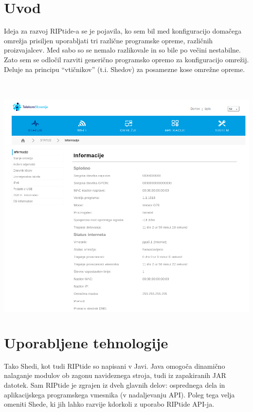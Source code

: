 \documentclass[12pt]{article}
\begin{document}
\tableofcontents
\newpage

\section{Uvod}
Ideja za razvoj RIPtide-a se je pojavila, ko sem bil med konfiguracijo
domačega omrežja prisiljen uporabljati tri različne programske opreme,
različnih proizvajalcev. Med sabo so se nemalo razlikovale in so bile
po večini nestabilne. Zato sem se odločil razviti generično programsko
opremo za konfiguracijo omrežij. Deluje na principu
“vtičnikov” (t.i. Shedov) za posamezne kose omrežne opreme.\\\\\\

\begin{center}
	\includegraphics[scale=0.5]{slike/telekom.png}
\end{center}
\newpage

\section{Uporabljene tehnologije}
Tako Shedi, kot tudi RIPtide so napisani v Javi. Java omogoča dinamično
nalaganje modulov ob zagonu navideznega stroja, tudi iz zapakiranih JAR
datotek. Sam RIPtide je zgrajen iz dveh glavnih delov: osprednega dela 
in aplikacijskega programskega vmesnika (v nadaljevanju API).
Poleg tega velja omeniti Shede, ki jih lahko razvije kdorkoli z uporabo
RIPtide API-ja.
\newpage
\end{document}
